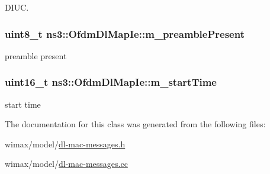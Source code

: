 D\+I\+UC. 

\subsubsection[{\texorpdfstring{m\+\_\+preamble\+Present}{m_preamblePresent}}]{\setlength{\rightskip}{0pt plus 5cm}uint8\+\_\+t ns3\+::\+Ofdm\+Dl\+Map\+Ie\+::m\+\_\+preamble\+Present\hspace{0.3cm}{\ttfamily [private]}}\hypertarget{classns3_1_1OfdmDlMapIe_a313d26870dfa890bb0246cad2c268a83}{}\label{classns3_1_1OfdmDlMapIe_a313d26870dfa890bb0246cad2c268a83}


preamble present 

\subsubsection[{\texorpdfstring{m\+\_\+start\+Time}{m_startTime}}]{\setlength{\rightskip}{0pt plus 5cm}uint16\+\_\+t ns3\+::\+Ofdm\+Dl\+Map\+Ie\+::m\+\_\+start\+Time\hspace{0.3cm}{\ttfamily [private]}}\hypertarget{classns3_1_1OfdmDlMapIe_a4d54e49b6f8867735059cd476c228cac}{}\label{classns3_1_1OfdmDlMapIe_a4d54e49b6f8867735059cd476c228cac}


start time 



The documentation for this class was generated from the following files\+:\begin{DoxyCompactItemize}
\item 
wimax/model/\hyperlink{dl-mac-messages_8h}{dl-\/mac-\/messages.\+h}\item 
wimax/model/\hyperlink{dl-mac-messages_8cc}{dl-\/mac-\/messages.\+cc}\end{DoxyCompactItemize}

